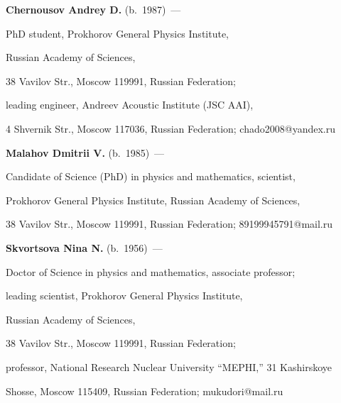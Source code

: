 \noindent


\textbf{Chernousov Andrey D.} (b.\ 1987)~---


PhD student, Prokhorov General Physics Institute, 


Russian Academy of Sciences, 


38 Vavilov Str., Moscow 119991, Russian Federation;


leading engineer, Andreev Acoustic Institute (JSC AAI),


4 Shvernik Str., Moscow 117036, Russian Federation; chado2008@yandex.ru








\vspace*{3pt}








\noindent


\textbf{Malahov Dmitrii V.} (b.\ 1985)~---


Candidate of Science (PhD) in physics and mathematics, scientist, 


Prokhorov General Physics Institute, Russian Academy of Sciences,


38 Vavilov Str., Moscow 119991, Russian Federation; 89199945791@mail.ru








\vspace*{3pt}





\noindent


\textbf{Skvortsova Nina N.} (b.\ 1956)~---


Doctor of Science in physics and mathematics, associate professor; 


leading scientist, Prokhorov General Physics Institute, 


Russian Academy of Sciences, 


38 Vavilov Str., Moscow 119991, Russian Federation;


professor, National Research Nuclear University ``MEPHI,'' 31 Kashirskoye


Shosse, Moscow 115409, Russian Federation; mukudori@mail.ru





 





\label{end\stat}





\renewcommand{\bibname}{\protect\rmfamily Литература}


